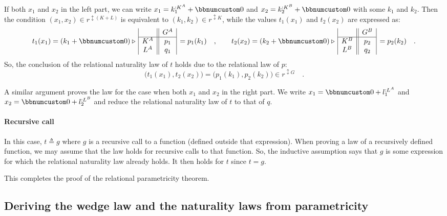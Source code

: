 If both $x_{1}$ and $x_{2}$ in the left part, we can write $x_{1}=k_{1}^{:K^{A}}+\bbnum 0$
and $x_{2}=k_{2}^{:K^{B}}+\bbnum 0$ with some $k_{1}$ and $k_{2}$.
Then the condition $(x_{1},x_{2})\in r^{\updownarrow(K+L)}$ is equivalent
to $(k_{1},k_{2})\in r^{\updownarrow K}$, while the values $t_{1}(x_{1})$
and $t_{2}(x_{2})$ are expressed as:
\[
t_{1}(x_{1})=(k_{1}+\bbnum 0)\triangleright\,\begin{array}{|c||c|}
 & G^{A}\\
\hline K^{A} & p_{1}\\
L^{A} & q_{1}
\end{array}\,=p_{1}(k_{1})\quad,\quad\quad t_{2}(x_{2})=(k_{2}+\bbnum 0)\triangleright\,\begin{array}{|c||c|}
 & G^{B}\\
\hline K^{B} & p_{2}\\
L^{B} & q_{2}
\end{array}\,=p_{2}(k_{2})\quad.
\]
So, the conclusion of the relational naturality law of $t$ holds
due to the relational law of $p$:
\[
\big(t_{1}(x_{1}),t_{2}(x_{2})\big)=\big(p_{1}(k_{1}),p_{2}(k_{2})\big)\in r^{\updownarrow G}\quad.
\]

A similar argument proves the law for the case when both $x_{1}$
and $x_{2}$ in the right part. We write $x_{1}=\bbnum 0+l_{1}^{:L^{A}}$
and $x_{2}=\bbnum 0+l_{2}^{:L^{B}}$ and reduce the relational naturality
law of $t$ to that of $q$.

\paragraph{Recursive call}

In this case, $t\triangleq g$ where $g$ is a recursive call to a
function (defined outside that expression). When proving a law of
a recursively defined function, we may assume that the law holds for
recursive calls to that function. So, the inductive assumption says
that $g$ is some expression for which the relational naturality law
already holds. It then holds for $t$ since $t=g$.

This completes the proof of the relational parametricity theorem.

\subsection{Deriving the wedge law and the naturality laws from parametricity}

